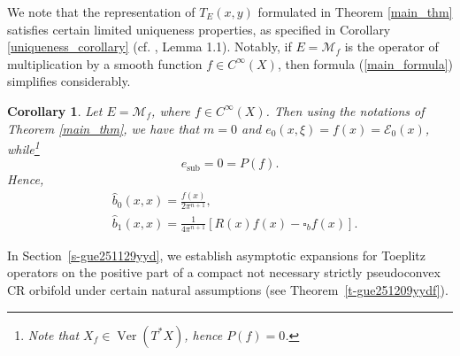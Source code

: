 \documentclass{article}
\newtheorem{corollary}[theorem]{Corollary}
\newcommand{\mce}{\mathcal E}
\newcommand{\mcm}{\mathcal M}
\DeclareMathOperator{\sub}{sub}
\DeclareMathOperator{\Ver}{Ver}
\begin{document}
%
%
We note that the representation of $T_E(x,y)$ formulated in Theorem \ref{main_thm} satisfies certain limited uniqueness properties, as specified in Corollary \ref{uniqueness_corollary} (cf. \cite{hsiao_shen}, Lemma 1.1).
%
Notably, if $E = \mcm_f$ is the operator of multiplication by a smooth function $f \in C^\infty(X)$, then formula (\ref{main_formula}) simplifies considerably.
%
\begin{corollary} Let $E = \mcm_f$, where $f \in C^\infty(X)$. Then using the notations of Theorem \ref{main_thm}, we have that $m = 0$ and $e_0(x,\xi) = f(x) = \mce_0(x)$, while\footnote{Note that $X_f \in \Ver(T^*X)$, hence $P(f) = 0$.} $$e_{\sub} = 0 = P(f).$$ Hence, $$\begin{aligned} &\hat b_0(x,x) = \frac{f(x)}{2\pi^{n+1}},\\ & \hat b_1(x,x) = \frac 1 {4\pi^{n+1}} \left[R(x) f(x) - \square_b f(x) \right]. \end{aligned}$$\end{corollary}

In Section~\ref{s-gue251129yyd}, we establish asymptotic expansions for Toeplitz operators on the positive part of a compact not necessary strictly pseudoconvex CR orbifold under certain natural assumptions (see Theorem~\ref{t-gue251209yydf}).
%
\end{document}
